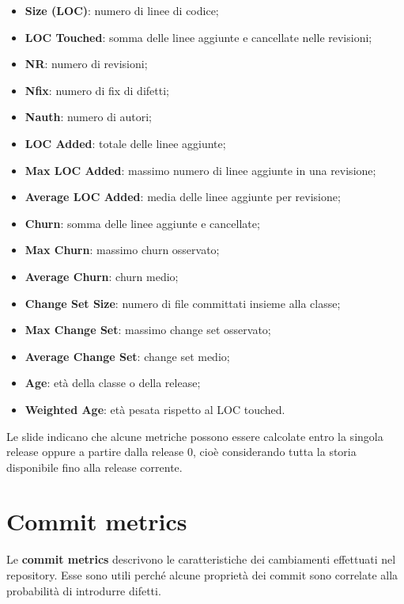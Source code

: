 \begin{itemize}
    \item \textbf{Size (LOC)}: numero di linee di codice;
    \item \textbf{LOC Touched}: somma delle linee aggiunte e cancellate nelle revisioni;
    \item \textbf{NR}: numero di revisioni;
    \item \textbf{Nfix}: numero di fix di difetti;
    \item \textbf{Nauth}: numero di autori;
    \item \textbf{LOC Added}: totale delle linee aggiunte;
    \item \textbf{Max LOC Added}: massimo numero di linee aggiunte in una revisione;
    \item \textbf{Average LOC Added}: media delle linee aggiunte per revisione;
    \item \textbf{Churn}: somma delle linee aggiunte e cancellate;
    \item \textbf{Max Churn}: massimo churn osservato;
    \item \textbf{Average Churn}: churn medio;
    \item \textbf{Change Set Size}: numero di file committati insieme alla classe;
    \item \textbf{Max Change Set}: massimo change set osservato;
    \item \textbf{Average Change Set}: change set medio;
    \item \textbf{Age}: età della classe o della release;
    \item \textbf{Weighted Age}: età pesata rispetto al LOC touched.
\end{itemize}

\begin{notaslide}
Le slide indicano che alcune metriche possono essere calcolate entro la singola release oppure a partire dalla release 0, cioè considerando tutta la storia disponibile fino alla release corrente.
\end{notaslide}

\section{Commit metrics}

Le \textbf{commit metrics} descrivono le caratteristiche dei cambiamenti effettuati nel repository. Esse sono utili perché alcune proprietà dei commit sono correlate alla probabilità di introdurre difetti.

